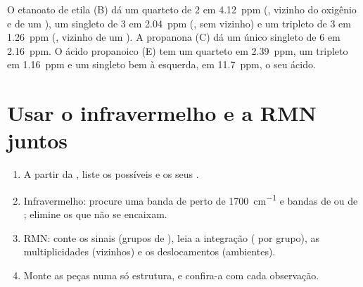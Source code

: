 \begin{example}\label{ex:g12:proton-nmr:reading}
O etanoato de etila (B) dá um quarteto de 2  em \qty{4.12}{ppm}
(, vizinho do oxigênio e de um ), um singleto de 3
 em \qty{2.04}{ppm} (, sem  vizinho) e um
tripleto de 3  em \qty{1.26}{ppm} (, vizinho de um
). A propanona (C) dá um único singleto de 6  em
\qty{2.16}{ppm}. O ácido propanoico (E) tem um quarteto em
\qty{2.39}{ppm}, um tripleto em \qty{1.16}{ppm} e um singleto bem à
esquerda, em \qty{11.7}{ppm}, o seu  ácido.
\end{example}

\section{Usar o infravermelho e a RMN juntos}


\begin{method}\label{met:g12:proton-nmr:identify}
\begin{enumerate}
  \item A partir da , liste os  possíveis e os
        seus .
  \item Infravermelho: procure uma banda de  perto de
        \qty{1700}{cm^{-1}} e bandas de  ou de ; elimine
        os  que não se encaixam.
  \item RMN: conte os sinais (grupos de ), leia a
        integração ( por grupo), as multiplicidades (vizinhos) e
        os deslocamentos (ambientes).
  \item Monte as peças numa só estrutura, e confira-a com cada
        observação.
\end{enumerate}
\end{method}

